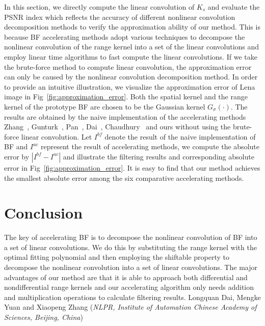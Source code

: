 \documentclass[twocolumn]{el-author}
\begin{document}
In this section, we directly compute the linear convolution of $K_s$ and evaluate the PSNR index which reflects the accuracy of different nonlinear convolution decomposition methods to verify the approximation ability of our method. This is because BF accelerating methods adopt various techniques to decompose the nonlinear convolution of the range kernel into a set of the linear convolutions and employ linear time algorithms to fast compute the linear convolutions. If we take the brute-force method to compute linear convolution, the approximation error can only be caused by the nonlinear convolution decomposition method. In order to provide an intuitive illustration, we visualize the approximation error of Lena image in Fig~\ref{fig:approximation_error}. Both the spatial kernel and the range kernel of the prototype BF are chosen to be the Gaussian kernel $G_{\sigma}(\cdot)$. The results are obtained by the naive implementation of the accelerating methods Zhang~\cite{Zhang_2012_TIP},  Gunturk~\cite{Gunturk_TIP_2011}, Pan~\cite{Pan_MPE_2014},  Dai~\cite{Dai_ET_2014},  Chaudhury~\cite{Chaudhury_TIP_2011} and ours without using the brute-force linear convolution. Let $I^{bf}$ denote the result of the naive implementation of BF and $I^{ac}$ represent the result of accelerating methods, we compute the absolute error by $|I^{bf} - I^{ac}|$ and illustrate the filtering results and corresponding absolute error in Fig~\ref{fig:approximation_error}. It is easy to find that our method achieves the smallest absolute error among the six comparative accelerating methods.


\section{Conclusion}

The key of accelerating BF is to decompose the nonlinear convolution of BF into a set of linear convolutions. We do this by substituting the range kernel with the optimal fitting polynomial and then employing the shiftable property to decompose the nonlinear convolution into a set of linear convolutions. The major advantages of our method are that it is able to approach both differential and nondifferential range kernels and our accelerating algorithm only needs addition and multiplication operations to calculate filtering results.
\vskip3pt
\noindent Longquan Dai, Mengke Yuan and Xiaopeng Zhang (\textit{NLPR, Institute of Automation Chinese Academy of Sciences, Beijing, China})
\vskip3pt
\end{document}
